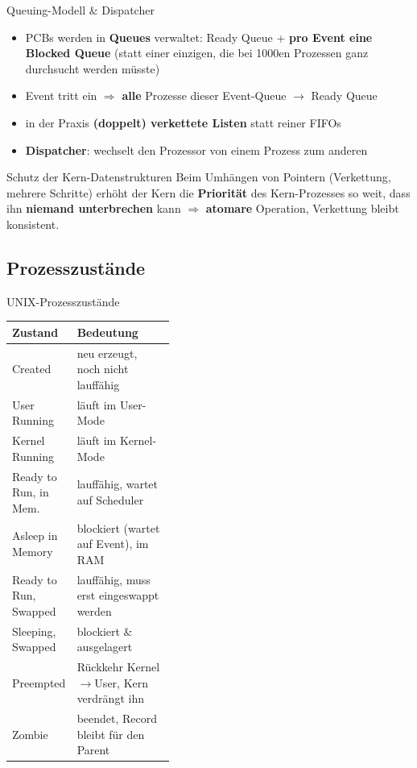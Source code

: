 \documentclass[a4paper, fontsize=7pt]{scrartcl}
\renewcommand*{\arraystretch}{1.5}  %
\begin{document}
\begin{mainbox}{Queuing-Modell \& Dispatcher}
\begin{itemize}
    \item PCBs werden in \textbf{Queues} verwaltet: Ready Queue +
          \textbf{pro Event eine Blocked Queue} (statt einer einzigen, die
          bei 1000en Prozessen ganz durchsucht werden müsste)
    \item Event tritt ein $\Rightarrow$ \textbf{alle} Prozesse dieser
          Event-Queue $\to$ Ready Queue
    \item in der Praxis \textbf{(doppelt) verkettete Listen} statt reiner
          FIFOs
    \item \textbf{Dispatcher}: wechselt den Prozessor von einem Prozess
          zum anderen
\end{itemize}
\end{mainbox}

\begin{mainbox}{Schutz der Kern-Datenstrukturen}
Beim Umhängen von Pointern (Verkettung, mehrere Schritte) erhöht der Kern
die \textbf{Priorität} des Kern-Prozesses so weit, dass ihn \textbf{niemand
unterbrechen} kann $\Rightarrow$ \textbf{atomare} Operation, Verkettung
bleibt konsistent.
\end{mainbox}

\subsection{Prozesszustände}

\begin{mainbox}{UNIX-Prozesszustände}
\renewcommand*{\arraystretch}{1.1}
\begin{tabularx}{\linewidth}{@{}>{\raggedright\arraybackslash}p{0.4\linewidth}|>{\raggedright\arraybackslash}X@{}}
\textbf{Zustand} & \textbf{Bedeutung} \\
\hline
Created & neu erzeugt, noch nicht lauffähig \\
User Running & läuft im User-Mode \\
Kernel Running & läuft im Kernel-Mode \\
Ready to Run, in Mem. & lauffähig, wartet auf Scheduler \\
Asleep in Memory & blockiert (wartet auf Event), im RAM \\
Ready to Run, Swapped & lauffähig, muss erst eingeswappt werden \\
Sleeping, Swapped & blockiert \& ausgelagert \\
Preempted & Rückkehr Kernel$\to$User, Kern verdrängt ihn \\
Zombie & beendet, Record bleibt für den Parent \\
\end{tabularx}
\end{mainbox}
\end{document}
